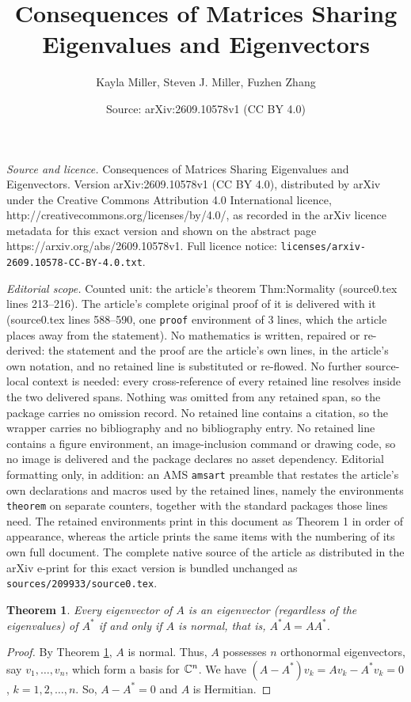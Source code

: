 \documentclass[10pt,a4paper]{amsart}
\title{Consequences of Matrices Sharing Eigenvalues and Eigenvectors}
\author{Kayla Miller, Steven J. Miller, Fuzhen Zhang}
\date{Source: arXiv:2609.10578v1 (CC BY 4.0)}
\newtheorem{theorem}{Theorem}
\begin{document}
\maketitle

\noindent\emph{Source and licence.} Consequences of Matrices Sharing Eigenvalues and Eigenvectors. Version arXiv:2609.10578v1 (CC BY 4.0), distributed by arXiv under the Creative Commons Attribution 4.0 International licence, http://creativecommons.org/licenses/by/4.0/, as recorded in the arXiv licence metadata for this exact version and shown on the abstract page https://arxiv.org/abs/2609.10578v1. Full licence notice: \texttt{licenses/arxiv-2609.10578-CC-BY-4.0.txt}.\par\smallskip

\noindent\textit{Editorial scope.} Counted unit: the article's theorem Thm:Normality (source0.tex lines 213--216). The article's complete original proof of it is delivered with it (source0.tex lines 588--590, one \texttt{proof} environment of 3 lines, which the article places away from the statement). No mathematics is written, repaired or re-derived: the statement and the proof are the article's own lines, in the article's own notation, and no retained line is substituted or re-flowed.  No further source-local context is needed: every cross-reference of every retained line resolves inside the two delivered spans.  Nothing was omitted from any retained span, so the package carries no omission record.  No retained line contains a citation, so the wrapper carries no bibliography and no bibliography entry.  No retained line contains a figure environment, an image-inclusion command or drawing code, so no image is delivered and the package declares no asset dependency.  Editorial formatting only, in addition: an AMS \texttt{amsart} preamble that restates the article's own declarations and macros used by the retained lines, namely the environments \texttt{theorem} on separate counters, together with the standard packages those lines need.  The retained environments print in this document as Theorem 1 in order of appearance, whereas the article prints the same items with the numbering of its own full document.  The complete native source of the article as distributed in the arXiv e-print for this exact version is bundled unchanged as \texttt{sources/209933/source0.tex}.
\begin{theorem}\label{Thm:Normality}
Every eigenvector  of $A$ is an eigenvector (regardless of the eigenvalues) of $A^*$ if and only if $A$ is \emph{normal},
that is,  $A^*A=AA^*$.
\end{theorem}

\begin{proof}  By Theorem \ref{Thm:Normality}, $A$ is normal. Thus, $A$ possesses $n$     orthonormal eigenvectors, say
$v_1, \dots, v_n$,  which  form a basis for $\Bbb C^n$. We have
 $(A-A^*)v_k=Av_k-A^*v_k =0$, $k=1, 2, \dots, n$. So, $A-A^*=0$ and $A$ is Hermitian. \end{proof}
\end{document}
